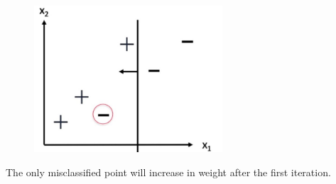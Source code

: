 \begin{answer}
\begin{figure}[h]
    \centering
    \includegraphics[width=7cm]{adaboost/1.jpg}
\end{figure}
The only misclassified point will increase in weight after the first iteration.
\end{answer}